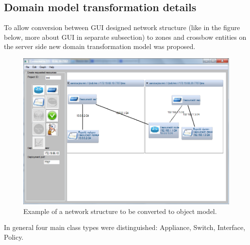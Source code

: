 \documentclass[11pt]{book}
\begin{document}
	
			\noindent
				\begin{minipage}{\textwidth}
				
			\end{minipage}  

			\noindent
			\begin{minipage}{\textwidth}
				
			\end{minipage}


		\subsection{Domain model transformation details}
			\label{sec:impl:model}

		To allow conversion between GUI designed network structure (like in the figure below, more about GUI in separate subsection) to
                zones and crossbow entities on the server side new domain transformation model was proposed. 
      
		\begin{figure}[H]
			\begin{center}
			\includegraphics[width=1.0\textwidth]{img/impl/network_structure_example.png}
			\end{center}
			\caption{Example of a network structure to be converted to object model.}
		\end{figure} 

		In general four main class types were distinguished: Appliance, Switch, Interface, Policy.
\end{document}
